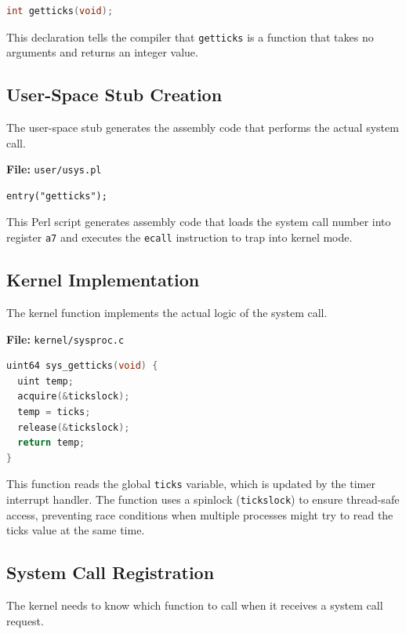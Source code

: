 \documentclass[a4paper]{article}
\begin{document}
\begin{lstlisting}[style=code, language=C]
int getticks(void);
\end{lstlisting}

This declaration tells the compiler that \texttt{getticks} is a function that takes no arguments and returns an integer value.

\subsection{User-Space Stub Creation}

The user-space stub generates the assembly code that performs the actual system call.

\textbf{File:} \texttt{user/usys.pl}

\begin{lstlisting}[style=code]
entry("getticks");
\end{lstlisting}

This Perl script generates assembly code that loads the system call number into register \texttt{a7} and executes the \texttt{ecall} instruction to trap into kernel mode.

\subsection{Kernel Implementation}

The kernel function implements the actual logic of the system call.

\textbf{File:} \texttt{kernel/sysproc.c}

\begin{lstlisting}[style=code, language=C]
uint64 sys_getticks(void) {
  uint temp;
  acquire(&tickslock);
  temp = ticks;
  release(&tickslock);
  return temp;
}
\end{lstlisting}

This function reads the global \texttt{ticks} variable, which is updated by the timer interrupt handler. The function uses a spinlock (\texttt{tickslock}) to ensure thread-safe access, preventing race conditions when multiple processes might try to read the ticks value at the same time.

\subsection{System Call Registration}

The kernel needs to know which function to call when it receives a system call request.
\end{document}
